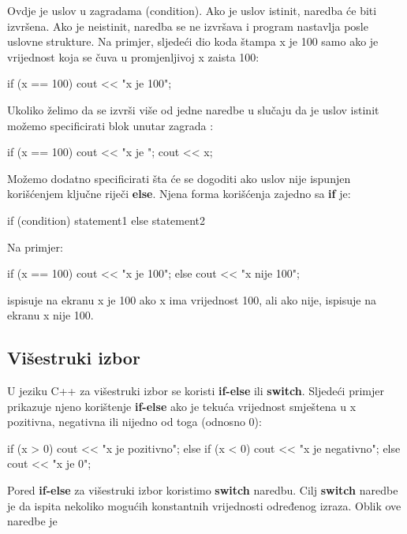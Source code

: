 \documentclass[11pt]{book}
\begin{document}
Ovdje je uslov u zagradama (condition). Ako je uslov istinit, naredba će biti izvršena. Ako je neistinit, naredba se ne izvršava i program nastavlja posle uslovne strukture. Na primjer, sljedeći dio koda štampa x je 100 samo ako je vrijednost koja se čuva u promjenljivoj x zaista 100:

\begin{shortlisting}
  if (x == 100) cout << "x je 100";
\end{shortlisting}

Ukoliko želimo da se izvrši više od jedne naredbe u slučaju da je uslov istinit možemo specificirati blok unutar zagrada {}:

\begin{shortlisting}
  if (x == 100)
    {
      cout << "x je ";
      cout << x;
    }
\end{shortlisting}

Možemo dodatno specificirati šta će se dogoditi ako uslov nije ispunjen korišćenjem ključne riječi \textbf{else}. Njena forma korišćenja zajedno sa \textbf{if} je:

\begin{shortlisting}
  if (condition)
  statement1
  else
  statement2
\end{shortlisting}

Na primjer:

\begin{shortlisting}
  if (x == 100)
  cout << "x je 100";
  else
  cout << "x nije 100";
\end{shortlisting}

ispisuje na ekranu x je 100 ako x ima vrijednost 100, ali ako nije, ispisuje na ekranu x nije 100.

\subsection{Višestruki izbor}

U jeziku C++ za višestruki izbor se koristi \textbf{if-else} ili \textbf{switch}. Sljedeći primjer prikazuje njeno korištenje \textbf{if-else} ako je tekuća vrijednost smještena u x pozitivna, negativna ili nijedno od toga (odnosno 0):

\begin{shortlisting}
  if (x > 0) cout << "x je pozitivno";
  else
  if (x < 0) cout << "x je negativno";
  else cout << "x je 0";
\end{shortlisting}

Pored \textbf{if-else} za višestruki izbor koristimo \textbf{switch} naredbu. Cilj \textbf{switch} naredbe je da ispita nekoliko mogućih konstantnih vrijednosti određenog izraza. Oblik ove naredbe je
\end{document}

